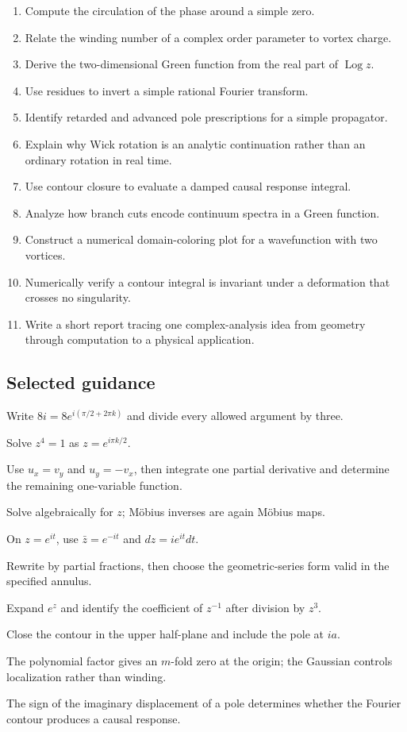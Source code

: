 \begin{enumerate}[label=\textbf{\arabic*.},leftmargin=*]
\item Compute the circulation of the phase around a simple zero.
\item Relate the winding number of a complex order parameter to vortex charge.
\item Derive the two-dimensional Green function from the real part of $\operatorname{Log} z$.
\item Use residues to invert a simple rational Fourier transform.
\item Identify retarded and advanced pole prescriptions for a simple propagator.
\item Explain why Wick rotation is an analytic continuation rather than an ordinary rotation in real time.
\item Use contour closure to evaluate a damped causal response integral.
\item Analyze how branch cuts encode continuum spectra in a Green function.
\item Construct a numerical domain-coloring plot for a wavefunction with two vortices.
\item Numerically verify a contour integral is invariant under a deformation that crosses no singularity.
\item Write a short report tracing one complex-analysis idea from geometry through computation to a physical application.
\end{enumerate}

\subsection*{Selected guidance}
\begin{description}[leftmargin=2.9cm,style=nextline]
\item[Foundation 11.] Write $8i=8e^{i(\pi/2+2\pi k)}$ and divide every allowed argument by three.
\item[Foundation 20.] Solve $z^4=1$ as $z=e^{i\pi k/2}$.
\item[Intermediate 7.] Use $u_x=v_y$ and $u_y=-v_x$, then integrate one partial derivative and determine the remaining one-variable function.
\item[Intermediate 18.] Solve algebraically for $z$; Möbius inverses are again Möbius maps.
\item[Intermediate 24.] On $z=e^{it}$, use $\bar z=e^{-it}$ and $dz=ie^{it}dt$.
\item[Advanced 8.] Rewrite by partial fractions, then choose the geometric-series form valid in the specified annulus.
\item[Advanced 13.] Expand $e^z$ and identify the coefficient of $z^{-1}$ after division by $z^3$.
\item[Advanced 18.] Close the contour in the upper half-plane and include the pole at $ia$.
\item[Physics 17.] The polynomial factor gives an $m$-fold zero at the origin; the Gaussian controls localization rather than winding.
\item[Physics 23.] The sign of the imaginary displacement of a pole determines whether the Fourier contour produces a causal response.
\end{description}
